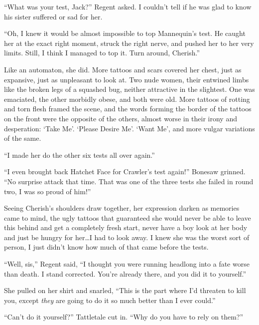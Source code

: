``What was your test, Jack?'' Regent asked.  I couldn't tell if he was glad to know his sister suffered or sad for her.



``Oh, I knew it would be almost impossible to top Mannequin's test.  He caught her at the exact right moment, struck the right nerve, and pushed her to her very limits.  Still, I think I managed to top it.  Turn around, Cherish.''



Like an automaton, she did.  More tattoos and scars covered her chest, just as expansive, just as unpleasant to look at.  Two nude women, their entwined limbs like the broken legs of a squashed bug, neither attractive in the slightest.  One was emaciated, the other morbidly obese, and both were old.  More tattoos of rotting and torn flesh framed the scene, and the words forming the border of the tattoos on the front were the opposite of the others, almost worse in their irony and desperation: `Take Me'.  `Please Desire Me'.  `Want Me', and more vulgar variations of the same.



``I made her do the other six tests all over again.''



``I even brought back Hatchet Face for Crawler's test again!'' Bonesaw grinned.  ``No surprise attack that time.  That was one of the three tests she failed in round two, I was so proud of him!''



Seeing Cherish's shoulders draw together, her expression darken as memories came to mind, the ugly tattoos that guaranteed she would never be able to leave this behind and get a completely fresh start, never have a boy look at her body and just be hungry for her\ldots I had to look away.  I knew she was the worst sort of person, I just didn't know how much of that came before the tests.



``Well, sis,'' Regent said, ``I thought you were running headlong into a fate worse than death.  I stand corrected.  You're already there, and you did it to yourself.''



She pulled on her shirt and snarled, ``This is the part where I'd threaten to kill you, except \emph{they }are going to do it so much better than I ever could.''



``Can't do it yourself?'' Tattletale cut in.  ``Why do you have to rely on them?''



